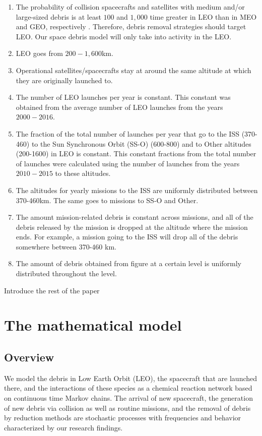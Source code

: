 \documentclass[pre,12pt]{revtex4-1}
\begin{document}
\begin{enumerate}
  \item The probability of collision spacecrafts and satellites with medium and/or large-sized debris is at least $100$ and $1,000$ time greater in LEO than in MEO and GEO, respectively \cite{orbitalDebris}. Therefore, debris removal strategies should target LEO. Our space debris model will only take into activity in the LEO.
  \item LEO goes from $200-1,600$km.
  \item Operational satellites/spacecrafts stay at around the same altitude at which they are originally launched to.
  \item The number of LEO launches per year is constant. This constant was obtained from the average number of LEO launches from the years $2000-2016$.
  \item The fraction of the total number of launches per year that go to the ISS (370-460) to the Sun Synchronous Orbit (SS-O) (600-800) and to Other altitudes (200-1600) in  LEO is constant. This constant fractions from the total number of launches were calculated using the number of launches from the years $2010-2015$ to these altitudes.
  \item The altitudes for yearly missions to the ISS are uniformly distributed between 370-460km. The same goes to missions to SS-O and Other.
  \item The amount mission-related debris is constant across missions, and all of the debris released by the mission is dropped at the altitude where the mission ends. For example, a mission going to the ISS will drop all of the debris somewhere between 370-460 km.
  \item The amount of debris obtained from figure  at a certain level is uniformly distributed throughout the level.\end{enumerate}


Introduce the rest of the paper


\section{The mathematical model}\label{Model}

\subsection{Overview}
We model the debris in Low Earth Orbit (LEO), the spacecraft that are launched there, and the interactions of these species as a chemical reaction network based on continuous time Markov chains. The arrival of new spacecraft, the generation of new debris via collision as well as routine missions, and the removal of debris by reduction methods are stochastic processes with frequencies and behavior characterized by our research findings.
\end{document}
